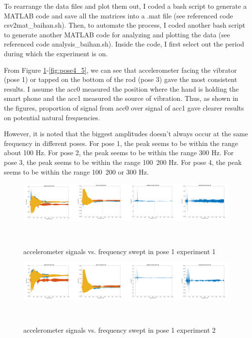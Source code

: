 \documentclass{sigchi}
\begin{document}
To rearrange the data files and plot them out, I coded a bash script to generate a MATLAB code and save all the matrices into a .mat file (see referenced code csv2mat\_baihan.sh). Then, to automate the process, I coded another bash script to generate another MATLAB code for analyzing and plotting the data (see referenced code analysis\_baihan.sh). Inside the code, I first select out the period during which the experiment is on.

From Figure \ref{fig:pose1_1}-\ref{fig:pose4_5}, we can see that accelerometer facing the vibrator (pose 1) or tapped on the bottom of the rod (pose 3) gave the most consistent results. I assume the acc0 measured the position where the hand is holding the smart phone and the acc1 measured the source of vibration. Thus, as shown in the figures, proportion of signal from acc0 over signal of acc1 gave clearer results on potential natural frequencies.

However, it is noted that the biggest amplitudes doesn't always occur at the same frequency in different poses. For pose 1, the peak seems to be within the range about 100 Hz. For pose 2, the peak seems to be within the range 300 Hz. For pose 3, the peak seems to be within the range 100~200 Hz. For pose 4, the peak seems to be within the range 100~200 or 300 Hz.


\begin{figure}
  \centering
  \includegraphics[width=1.95\columnwidth]{figures/pose1_1}
  \caption{accelerometer signals vs. frequency swept in pose 1 experiment 1}
    ~\label{fig:pose1_1}
\end{figure}

\begin{figure}
  \centering
  \includegraphics[width=1.95\columnwidth]{figures/pose1_2}
  \caption{accelerometer signals vs. frequency swept in pose 1 experiment 2}
    ~\label{fig:pose1_2}
\end{figure}
\end{document}
